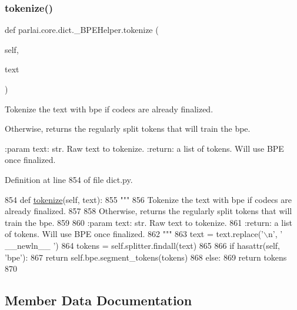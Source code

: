 \subsubsection{\texorpdfstring{tokenize()}{tokenize()}}
{\footnotesize\ttfamily def parlai.\+core.\+dict.\+\_\+\+B\+P\+E\+Helper.\+tokenize (\begin{DoxyParamCaption}\item[{}]{self,  }\item[{}]{text }\end{DoxyParamCaption})}

\begin{DoxyVerb}Tokenize the text with bpe if codecs are already finalized.

Otherwise, returns the regularly split tokens that will train the bpe.

:param text: str. Raw text to tokenize.
:return: a list of tokens. Will use BPE once finalized.
\end{DoxyVerb}
 

Definition at line 854 of file dict.\+py.


\begin{DoxyCode}
854     \textcolor{keyword}{def }\hyperlink{namespaceparlai_1_1agents_1_1tfidf__retriever_1_1build__tfidf_a1fdb457e98eb4e4c26047e229686a616}{tokenize}(self, text):
855         \textcolor{stringliteral}{"""}
856 \textcolor{stringliteral}{        Tokenize the text with bpe if codecs are already finalized.}
857 \textcolor{stringliteral}{}
858 \textcolor{stringliteral}{        Otherwise, returns the regularly split tokens that will train the bpe.}
859 \textcolor{stringliteral}{}
860 \textcolor{stringliteral}{        :param text: str. Raw text to tokenize.}
861 \textcolor{stringliteral}{        :return: a list of tokens. Will use BPE once finalized.}
862 \textcolor{stringliteral}{        """}
863         text = text.replace(\textcolor{stringliteral}{'\(\backslash\)n'}, \textcolor{stringliteral}{' \_\_newln\_\_ '})
864         tokens = self.splitter.findall(text)
865 
866         \textcolor{keywordflow}{if} hasattr(self, \textcolor{stringliteral}{'bpe'}):
867             \textcolor{keywordflow}{return} self.bpe.segment\_tokens(tokens)
868         \textcolor{keywordflow}{else}:
869             \textcolor{keywordflow}{return} tokens
870 
\end{DoxyCode}


\subsection{Member Data Documentation}
\mbox{\label{classparlai_1_1core_1_1dict_1_1__BPEHelper_af99fd825694f985095fd9ac55fcd2ba3}} 
